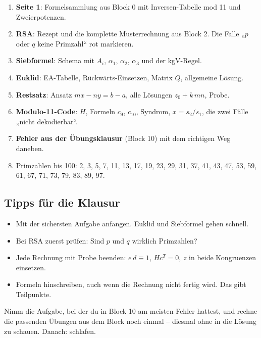\begin{enumerate}
\item[\cb] \textbf{Seite 1}: Formelsammlung aus Block 0 mit Inversen-Tabelle mod 11 und Zweierpotenzen.
\item[\cb] \textbf{RSA}: Rezept und die komplette Musterrechnung aus Block 2. Die Falle „$p$ oder $q$ keine Primzahl“ rot markieren.
\item[\cb] \textbf{Siebformel}: Schema mit $A_i$, $\alpha_1$, $\alpha_2$, $\alpha_3$ und der kgV-Regel.
\item[\cb] \textbf{Euklid}: EA-Tabelle, Rückwärts-Einsetzen, Matrix $Q$, allgemeine Lösung.
\item[\cb] \textbf{Restsatz}: Ansatz $mx - ny = b - a$, alle Lösungen $z_0 + k\,mn$, Probe.
\item[\cb] \textbf{Modulo-11-Code}: $H$, Formeln $c_9$, $c_{10}$, Syndrom, $x = s_2/s_1$, die zwei Fälle „nicht dekodierbar“.
\item[\cb] \textbf{Fehler aus der Übungsklausur} (Block 10) mit dem richtigen Weg daneben.
\item[\cb] Primzahlen bis 100: 2, 3, 5, 7, 11, 13, 17, 19, 23, 29, 31, 37, 41, 43, 47, 53, 59, 61, 67, 71, 73, 79, 83, 89, 97.
\end{enumerate}

\subsection*{Tipps für die Klausur}
\begin{itemize}
\item Mit der sichersten Aufgabe anfangen. Euklid und Siebformel gehen schnell.
\item Bei RSA zuerst prüfen: Sind $p$ und $q$ wirklich Primzahlen?
\item Jede Rechnung mit Probe beenden: $e\,d \equiv 1$, $H c^T = 0$, $z$ in beide Kongruenzen einsetzen.
\item Formeln hinschreiben, auch wenn die Rechnung nicht fertig wird. Das gibt Teilpunkte.
\end{itemize}

Nimm die Aufgabe, bei der du in Block 10 am meisten Fehler hattest, und rechne die passenden Übungen aus dem Block noch einmal
-- diesmal ohne in die Lösung zu schauen. Danach: schlafen.


